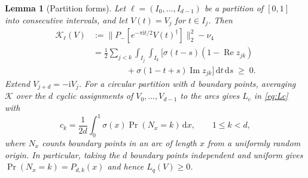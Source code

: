 \documentclass[aps,prl,reprint,superscriptaddress,longbibliography,floatfix,raggedbottom]{revtex4-2}
\newtheorem{lemma}{Lemma}
\newcommand{\ii}{\mathrm i}
\newcommand{\dd}{\,\mathrm d}
\newcommand{\norm}[1]{\lVert #1\rVert}
\DeclareMathOperator{\Prob}{Pr}
\begin{document}
\begin{lemma}[Partition forms]\label{lem:partitions}
Let $\ell=(I_0,\dots,I_{d-1})$ be a partition of $[0,1]$ into
consecutive intervals, and let $V(t)=V_j$ for $t\in I_j$. Then
\begin{equation}\label{eq:partitionform}
\begin{split}
\mathcal K_\ell(V)
&:=\norm{P_-[e^{-\pi\ii t/2}V(t)^\dagger]}_2^2-\nu_4\\
&=\frac12\sum_{j<k}\int_{I_j}\!\int_{I_k}
\bigl[\sigma(t-s)(1-\operatorname{Re}z_{jk})\\
&\hspace{4em}+\sigma(1-t+s)\operatorname{Im}z_{jk}\bigr]\dd t\dd s
\;\ge\;0 .
\end{split}
\end{equation}
Extend $V_{j+d}=-\ii V_j$. For a circular partition with $d$ boundary
points, averaging $\mathcal K$ over the $d$ cyclic assignments of
$V_0,\dots,V_{d-1}$ to the arcs gives $L_c$ in \eqref{eq:Lc} with
\begin{equation}\label{eq:arccount}
c_k=\frac1{2d}\int_0^1\sigma(x)\Prob(N_x=k)\dd x,\qquad 1\le k<d,
\end{equation}
where $N_x$ counts boundary points in an arc of length $x$ from a
uniformly random origin. In particular, taking the $d$ boundary points
independent and uniform gives $\Prob(N_x=k)=P_{d,k}(x)$ and hence
$L_q(V)\ge0$.
\end{lemma}
\end{document}
